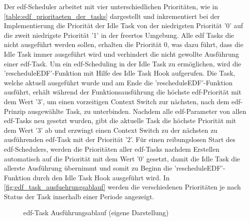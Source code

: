 \documentclass[../EDF Master Thesis.tex]{subfiles}
\begin{document}
    Der \ac{edf}-Scheduler arbeitet mit vier unterschiedlichen Prioritäten, wie in \autoref{table:edf_prioritaeten_der_tasks} dargestellt und inkrementiert bei der Implementierung die Priorität der Idle Task von der niedrigsten Priorität '0' auf die zweit niedrigste Priorität '1' in der \ac{freertos} Umgebung.
    Alle \ac{edf} Tasks die nicht ausgeführt werden sollen, erhalten die Priorität 0, was dazu führt, dass die Idle Task immer ausgeführt wird und verhindert die nicht gewollte Ausführung einer \ac{edf}-Task.
    Um ein \ac{edf}-Scheduling in der Idle Task zu ermöglichen, wird die 'rescheduleEDF'-Funktion mit Hilfe des Idle Task Hook aufgerufen.
    Die Task, welche aktuell ausgeführt wurde und am Ende die 'rescheduleEDF'-Funktion ausführt, erhält während der Funktionsausführung die höchste \ac{edf}-Priorität mit dem Wert '3', um einen vorzeitigen Context Switch zur nächsten, nach dem \ac{edf}-Prinzip ausgewählte Task, zu unterbinden.
    Nachdem alle \ac{edf}-Parameter von allen \ac{edf}-Tasks neu gesetzt wurden, gibt die aktuelle Task die höchste Priorität mit dem Wert '3' ab und erzwingt einen Context Switch zu der nächsten zu ausführenden \ac{edf}-Task mit der Priorität '2'.
    Für einen reibungslosen Start des \ac{edf}-Schedulers, werden die Prioritäten aller \ac{edf}-Tasks nachdem Erstellen automatisch auf die Priorität mit dem Wert '0' gesetzt, damit die Idle Task die allerste Ausführung übernimmt und somit zu Beginn die 'rescheduleEDF'-Funktion durch den Idle Task Hook ausgeführt wird.
    In \autoref{fig:edf_task_ausfuehrungsablauf} werden die verschiedenen Prioritäten je nach Status der Task innerhalb einer Periode angezeigt.
    
    \begin{figure}[ht!]
        \begin{center}
        \end{center}
        \caption[\ac{edf}-Task Ausführungsablauf]{\ac{edf}-Task Ausführungsablauf (eigene Darstellung)}
        \label{fig:edf_task_ausfuehrungsablauf}
    \end{figure}
\end{document}
